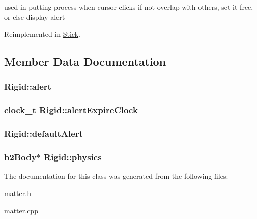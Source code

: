 used in putting process when cursor clicks if not overlap with others, set it free, or else display alert 



Reimplemented in \hyperlink{classStick_a279b6f02d394d224382007a23edd69a2}{Stick}.



\subsection{Member Data Documentation}
\hypertarget{classRigid_ae4294b58e54c93024b5a9cb91f23f210}{}
\subsubsection[{alert}]{ Rigid\+::alert\hspace{0.3cm}{\ttfamily [private]}}\label{classRigid_ae4294b58e54c93024b5a9cb91f23f210}
\hypertarget{classRigid_af2af56a112060d744f9ebe2ca4d96563}{}
\subsubsection[{alert\+Expire\+Clock}]{\setlength{\rightskip}{0pt plus 5cm}clock\+\_\+t Rigid\+::alert\+Expire\+Clock\hspace{0.3cm}{\ttfamily [private]}}\label{classRigid_af2af56a112060d744f9ebe2ca4d96563}
\hypertarget{classRigid_a564811283962ff52442d5e36caaeb4a2}{}
\subsubsection[{default\+Alert}]{ Rigid\+::default\+Alert\hspace{0.3cm}{\ttfamily [private]}}\label{classRigid_a564811283962ff52442d5e36caaeb4a2}
\hypertarget{classRigid_ab08647ccd5ced8fb48cf1a43a157a922}{}
\subsubsection[{physics}]{\setlength{\rightskip}{0pt plus 5cm}b2\+Body$\ast$ Rigid\+::physics\hspace{0.3cm}{\ttfamily [protected]}}\label{classRigid_ab08647ccd5ced8fb48cf1a43a157a922}


The documentation for this class was generated from the following files\+:\begin{DoxyCompactItemize}
\item 
\hyperlink{matter_8h}{matter.\+h}\item 
\hyperlink{matter_8cpp}{matter.\+cpp}\end{DoxyCompactItemize}
